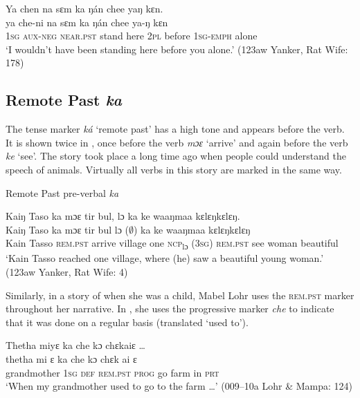     \ex \label{ex:122b} Ya chen na sɛm ka ŋán chee yaŋ kɛn.\\
    \gll ya    che-ni    na        sɛm    ka    ŋán  chee    ya-ŋ      kɛn\\
    \textsc{1sg}  \textsc{aux-neg}  \textsc{near.pst}  stand    here  \textsc{2pl}  before  \textsc{1sg-emph}  alone\\
    \glt ‘I wouldn't have been standing here before you alone.' (123aw Yanker, Rat Wife: 178)
    \z
    \z

\subsection{Remote Past \textit{ka}}
\label{sec:4.3.2}
The tense marker \textit{ká} ‘remote past' has a high tone and appears before the verb. It is shown twice in , once before the verb \textit{mɔɛ} ‘arrive' and again before the verb \textit{ke} ‘see'. The story took place a long time ago when people could understand the speech of animals. Virtually all verbs in this story are marked in the same way.

\ea%
    \label{ex:123}
    Remote Past pre-verbal \textit{ka}\\

    \vspace{6pt}
    
    Kaiŋ Taso ka mɔɛ tir bul, lɔ ka ke waaŋmaa kɛlɛŋkɛlɛŋ.\\
    \gll Kaiŋ Taso  ka      mɔɛ    tir      bul  lɔ    ($\emptyset$)   ka       ke    waaŋmaa  kɛlɛŋkɛlɛŋ\\
    Kain Tasso  \textsc{rem.pst}  arrive    village  one  \textsc{ncp}\textsubscript{lɔ}  (3\textsc{sg}) \textsc{rem.pst} see  woman    beautiful\\
    \glt ‘Kain Tasso reached one village, where (he) saw a beautiful young woman.' (123aw Yanker, Rat Wife: 4)
\z

Similarly, in a story of when she was a child, Mabel Lohr uses the \textsc{rem.pst} marker throughout her narrative. In , she uses the progressive marker \textit{che} to indicate that it was done on a regular basis (translated ‘used to').

\ea%
    \label{ex:124}
    Thetha miyɛ ka che kɔ chɛkaiɛ …\\
    \gll thetha      mi    ɛ    ka        che    kɔ    chɛk  ai    ɛ\\
    grandmother  \textsc{1sg}  \textsc{def}  \textsc{rem.pst}    \textsc{prog}    go    farm  in    \textsc{prt}\\
    \glt ‘When my grandmother used to go to the farm …' (009--10a Lohr \& Mampa: 124)
\z

